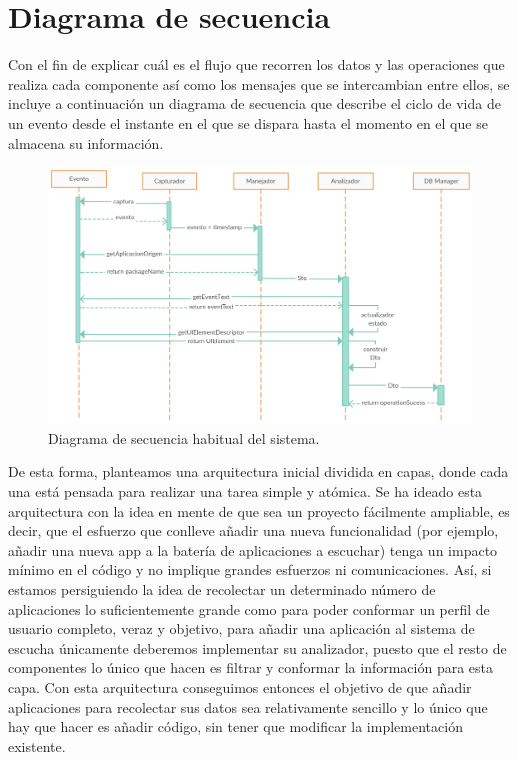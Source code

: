\documentclass[12pt,a4paper,oneside]{book} %
\begin{document}
\section{Diagrama de secuencia}
Con el fin de explicar cuál es el flujo que recorren los datos y las operaciones que realiza cada componente así como los mensajes que se intercambian entre ellos, se incluye a continuación un diagrama de secuencia que describe el ciclo de vida de un evento desde el instante en el que se dispara hasta el momento en el que se almacena su información. 
\begin{landscape}
\begin{figure}[htb]
  \begin{center}
     \includegraphics[width=1.5\textwidth]{pictures/secuencediagrams/diagrama_seq_flujo.png}
  \end{center}
  \caption[Diagrama de secuencia]{Diagrama de secuencia habitual del sistema.}
    \label{fig:LandscapeFigure}
\end{figure}
\end{landscape}
De esta forma, planteamos una arquitectura inicial dividida en capas, donde cada una está pensada para realizar una tarea simple y atómica. 
\newline \newline 
Se ha ideado esta arquitectura con la idea en mente de que sea un proyecto fácilmente ampliable, es decir, que el esfuerzo que conlleve añadir una nueva funcionalidad (por ejemplo, añadir una nueva app a la batería de aplicaciones a escuchar) tenga un impacto mínimo en el código y no implique grandes esfuerzos ni comunicaciones. 
\newline \newline 
Así, si estamos persiguiendo la idea de recolectar un determinado número de aplicaciones lo suficientemente grande como para poder conformar un perfil de usuario completo, veraz y objetivo, para añadir una aplicación al sistema de escucha únicamente deberemos implementar su analizador, puesto que el resto de componentes lo único que hacen es filtrar y conformar la información para esta capa. 
\newline \newline 
Con esta arquitectura conseguimos entonces el objetivo de que añadir aplicaciones para recolectar sus datos sea relativamente sencillo y lo único que hay que hacer es añadir código, sin tener que modificar la implementación existente. 
\end{document}
